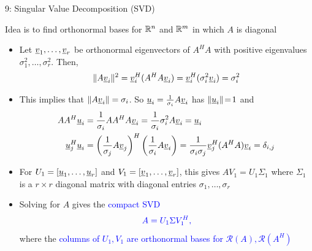 \documentclass[10pt,letterpaper,english]{beamer}
\begin{document}
\begin{frame}{9: Singular Value Decomposition (SVD)}

Idea is to find orthonormal bases for $\mathbb{R}^n$ and $\mathbb{R}^m$ in which $A$ is diagonal

\begin{itemize}
\setlength\itemsep{3mm}

\item<1-> Let $\underline{v}_1, \ldots, \underline{v}_r$ be orthonormal eigenvectors of $A^H A$ with positive eigenvalues $\sigma_1^2,\ldots,\sigma_r^2$.
Then, \[\|A \underline{v}_i\| ^2 = \underline{v}_i^H (A^H A \underline{v}_i) =  \underline{v}_i^H (\sigma_i^2\underline{v}_i) = \sigma_i^2 \]

\item<2-> This implies that $\|A \underline{v}_i\| = \sigma_i$.
So $\underline{u}_i = \frac{1}{\sigma_i} A\underline{v}_i$ has $\| \underline{u}_i \| \!=\! 1$ and \vspace{-1mm}
\begin{align*}
A A^H \vecnot{u}_i &= \frac{1}{\sigma_i} A A^H A \vecnot{v}_i = \frac{1}{\sigma_i} \sigma_i^2 A \vecnot{v}_i = \vecnot{u}_i
\\
\vecnot{u}_j^H \vecnot{u}_i &= \left(\frac{1}{\sigma_j} A \vecnot{v}_j \right)^H \left(\frac{1}{\sigma_i} A \vecnot{v}_i \right) =\frac{1}{\sigma_i \sigma_j} \vecnot{v}_j^H (A^H A) \vecnot{v}_i = \delta_{i,j}  \vspace{-1mm}
\end{align*}


\item<3-> For $U_1 = [\underline{u}_1,\ldots,\underline{u}_r]
$ and $V_1 = [\underline{v}_1,\ldots,\underline{v}_r]$, this gives $A V_1 = U_1 \Sigma_1$ where $\Sigma_1$ is a $r \times r$ diagonal matrix with diagonal entries $\sigma_1,\ldots,\sigma_r$

\item<4-> Solving for $A$ gives the \textcolor{blue}{compact SVD} \vspace{-1mm} \[ \color{blue} A = U_1 \Sigma V_1^H, \vspace{-1mm}\]
where the \textcolor{blue}{columns of $U_1, V_1$ are orthonormal bases for $\mathcal{R}(A), \mathcal{R}(A^H)$}

\end{itemize}


\end{frame}
\end{document}
